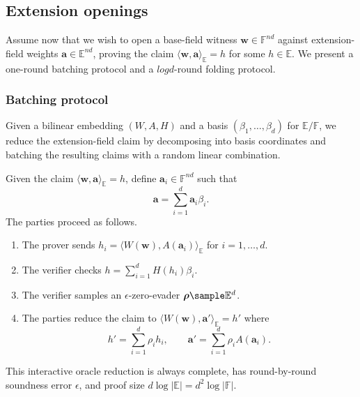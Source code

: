 \subsection{Extension openings}

Assume now that we wish to open a base-field witness $\mathbf{w} \in \mathbb{F}^{nd}$ against extension-field weights $\mathbf{a} \in \mathbb{E}^{n d}$, proving the claim $\langle \mathbf{w}, \mathbf{a}\rangle_\mathbb{E} = h$ for some $h \in \mathbb{E}$. We present a one-round batching protocol and a $log d$-round folding protocol.

\subsubsection{Batching protocol}
Given a bilinear embedding $(W, A, H)$ and a basis $(\beta_1, \dots, \beta_d)$ for $\mathbb{E}/\mathbb{F}$, we reduce the extension-field claim by decomposing into basis coordinates and batching     the resulting claims with a random linear combination.

\begin{construction}
Given the claim $\langle \mathbf{w}, \mathbf a\rangle_\mathbb{E}=h$, define $\mathbf{a}_i \in \mathbb{F}^{nd}$ such that 
\[
\mathbf{a} = \sum_{i=1}^d \mathbf{a}_i \beta_i \text{.}
\]
The parties proceed as follows.
\begin{enumerate}
    \item The prover sends $h_i = \langle W(\mathbf{w}), A(\mathbf{a}_i) \rangle_{\mathbb{E}}$  for $i=1,\ldots,d$.
    \item The verifier checks $h = \sum_{i=1}^{d} H(h_i) \beta_i$.
    \item The verifier samples an $\epsilon$-zero-evader $\boldsymbol{\rho} \sample\mathbb E^d$.
    \item The parties reduce the claim to $\langle W(\mathbf{w}), \mathbf a'\rangle_\mathbb{E}=h'$ where 
    \[
    h' = \sum_{i=1}^{d} \rho_i h_i,
    \qquad
    \mathbf{a}' = \sum_{i=1}^{d} \rho_i  A(\mathbf{a}_i) \text{.}
    \]
\end{enumerate}
This interactive oracle reduction is always complete, has round-by-round soundness error $\epsilon$, and proof size $d \log |\mathbb{E}| = d^2 \log |\mathbb{F}|$.
\end{construction}

